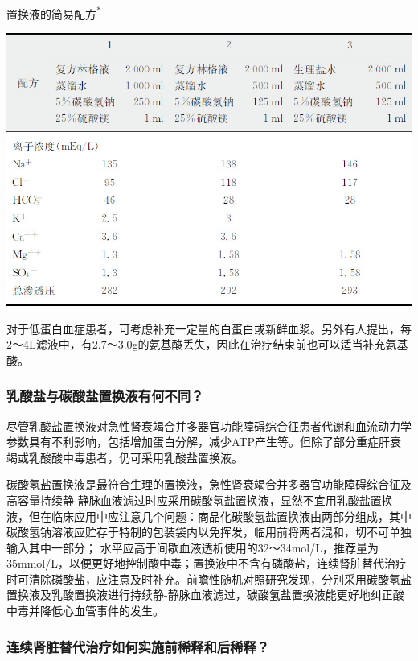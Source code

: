 \begin{table}[htbp]
\centering
\caption{置换液的简易配方\textsuperscript{*}}
\label{tab12-2}
\includegraphics{./images/Image00094.jpg}
\end{table}



对于低蛋白血症患者，可考虑补充一定量的白蛋白或新鲜血浆。另外有人提出，每2～4L滤液中，有2.7～3.0g的氨基酸丢失，因此在治疗结束前也可以适当补充氨基酸。

\subsubsection{乳酸盐与碳酸盐置换液有何不同？}

尽管乳酸盐置换液对急性肾衰竭合并多器官功能障碍综合征患者代谢和血流动力学参数具有不利影响，包括增加蛋白分解，减少ATP产生等。但除了部分重症肝衰竭或乳酸酸中毒患者，仍可采用乳酸盐置换液。

碳酸氢盐置换液是最符合生理的置换液，急性肾衰竭合并多器官功能障碍综合征及高容量持续静-静脉血液滤过时应采用碳酸氢盐置换液，显然不宜用乳酸盐置换液，但在临床应用中应注意几个问题：商品化碳酸氢盐置换液由两部分组成，其中碳酸氢钠溶液应贮存于特制的包装袋内以免挥发，临用前将两者混和，切不可单独输入其中一部分；
水平应高于间歇血液透析使用的32～34mol/L，推荐量为35mmol/L，以便更好地控制酸中毒；置换液中不含有磷酸盐，连续肾脏替代治疗时可清除磷酸盐，应注意及时补充。前瞻性随机对照研究发现，分别采用碳酸氢盐置换液及乳酸置换液进行持续静-静脉血液滤过，碳酸氢盐置换液能更好地纠正酸中毒并降低心血管事件的发生。

\subsubsection{连续肾脏替代治疗如何实施前稀释和后稀释？}

